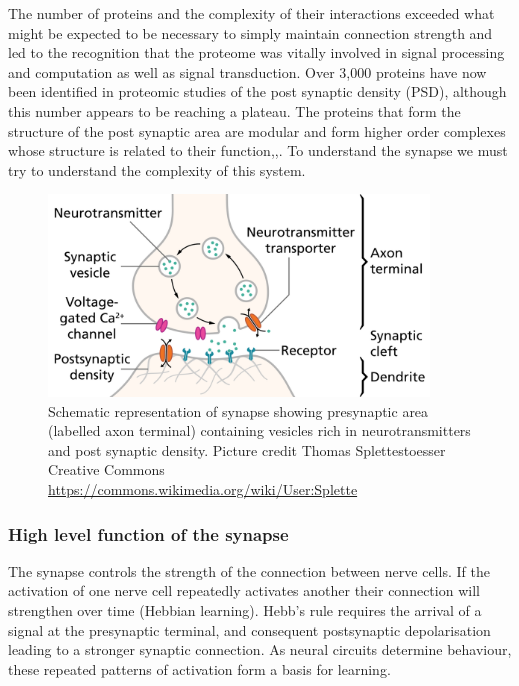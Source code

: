 The number of proteins and the complexity of their interactions exceeded what might be expected to be necessary to simply maintain connection strength 
and led to the recognition that the proteome was vitally involved in signal processing and computation as well as signal transduction\cite{grant2018synaptomic}.  Over 3,000 proteins have now been identified in proteomic studies of the post synaptic density (PSD), although this number appears to be reaching a plateau\cite{heil2018systems}. 
The proteins that form the structure of the post synaptic area are modular and form higher order complexes whose structure is related to their function\cite{pocklington2006proteomes},\cite{zhu2016mechanistic},\cite{frank2016nmda}. To understand the synapse we must try to understand the complexity of this system.

\begin{figure}
    \centering
    \includegraphics[width=0.9\textwidth]{images/SynapseSchematic_en.png}
    \caption[Schemtatic representation of synapse]{Schematic representation of synapse showing presynaptic area (labelled axon terminal) containing vesicles rich in neurotransmitters and post synaptic density.  Picture credit Thomas Splettestoesser Creative Commons \url{https://commons.wikimedia.org/wiki/User:Splette}}
    \label{fig:synapse}
\end{figure}





\subsubsection{High level function of the synapse}

The synapse controls the strength of the connection between nerve cells. If the activation of one nerve cell repeatedly activates another their connection will strengthen over time (Hebbian learning)\cite{hebb1949organization_check}. Hebb's rule \cite{hebb1949organization_check} requires the arrival of a signal at the presynaptic terminal, and consequent postsynaptic depolarisation leading to a stronger synaptic connection.  As neural circuits determine behaviour, these repeated patterns of activation form a basis for learning.%

